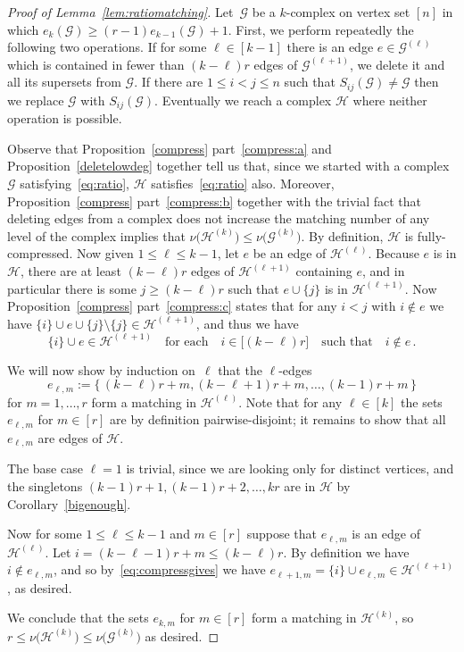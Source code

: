 \documentclass[12pt,a4paper]{amsart}
\newcommand{\Hy}{\mathcal{H}}
\newcommand{\cG}{\mathcal{G}}
\begin{document}
\begin{proof}[Proof of Lemma~\ref{lem:ratiomatching}]
 Let~$\cG$ be a $k$-complex on vertex set $[n]$ in which 
$e_k(\cG) \geq (r-1)e_{k-1}(\cG)+1$. First, we perform repeatedly the following two operations. If for some $\ell\in[k-1]$ there is an edge $e\in\cG^{(\ell)}$ which is contained in fewer than $(k-\ell)r$ edges of $\cG^{(\ell+1)}$, we delete it and all its supersets from $\cG$. If there are $1\le i<j\le n$ such that $S_{ij}(\cG)\neq\cG$ then we replace $\cG$ with $S_{ij}(\cG)$. Eventually we reach a complex $\Hy$ where neither operation is possible.

Observe that Proposition~\ref{compress} part~\ref{compress:a} and Proposition~\ref{deletelowdeg} together tell us that, since we started with a complex~$\cG$ satisfying~\eqref{eq:ratio}, $\Hy$ satisfies~\eqref{eq:ratio} also. Moreover, Proposition~\ref{compress} part~\ref{compress:b} together with the trivial fact that deleting edges from a complex does not increase the matching number of any level of the complex implies that $\nu\big(\Hy^{(k)}\big)\le\nu\big(\cG^{(k)}\big)$. By definition, $\Hy$ is fully-compressed. Now given $1\le\ell\le k-1$, let $e$ be an edge of $\Hy^{(\ell)}$. Because $e$ is in $\Hy$, there are at least $(k-\ell)r$ edges of $\Hy^{(\ell+1)}$ containing $e$, and in particular there is some $j\ge(k-\ell)r$ such that $e\cup\{j\}$ is in $\Hy^{(\ell+1)}$. Now Proposition~\ref{compress} part~\ref{compress:c} states that for any $i<j$ with $i\notin e$ we have $\{i\}\cup e\cup\{j\}\setminus\{j\}\in\Hy^{(\ell+1)}$, and thus we have
 \begin{equation}\label{eq:compressgives}
  \{i\}\cup e\in\Hy^{(\ell+1)}\quad\text{for each}\quad i\in\big[(k-\ell)r\big]\quad\text{such that}\quad i\notin e\,.
 \end{equation}

  We will now show by induction on~$\ell$ that the $\ell$-edges 
  \[e_{\ell,m}:=\big\{\, (k-\ell)r+m, (k-\ell+1)r+m, \ldots, (k-1)r+m \,\big\}\] 
  for $m=1,\ldots,r$ form a matching in $\Hy^{(\ell)}$.
  Note that for any $\ell\in[k]$ the sets
  $e_{\ell,m}$ for $m\in[r]$ are by definition pairwise-disjoint; it remains to show that
  all $e_{\ell,m}$ are edges of $\Hy$.

  The base case $\ell=1$ is trivial, since we are looking only for distinct
  vertices, and the singletons $(k-1)r+1,(k-1)r+2,\ldots,kr$ are in $\Hy$ by
  Corollary~\ref{bigenough}.

  Now for some $1\le\ell\le k-1$ and $m\in[r]$ suppose that $e_{\ell,m}$ is an edge of $\Hy^{(\ell)}$. Let $i=(k-\ell-1)r+m\le(k-\ell)r$. By definition we have $i\notin e_{\ell,m}$, and so by~\eqref{eq:compressgives} we have $e_{\ell+1,m}=\{i\}\cup e_{\ell,m}\in\Hy^{(\ell+1)}$, as desired.
  
  We conclude that the sets $e_{k,m}$ for $m\in[r]$ form a matching in $\Hy^{(k)}$, so $r\le\nu\big(\Hy^{(k)}\big)\le\nu\big(\cG^{(k)}\big)$ as desired.
\end{proof}
\end{document}
